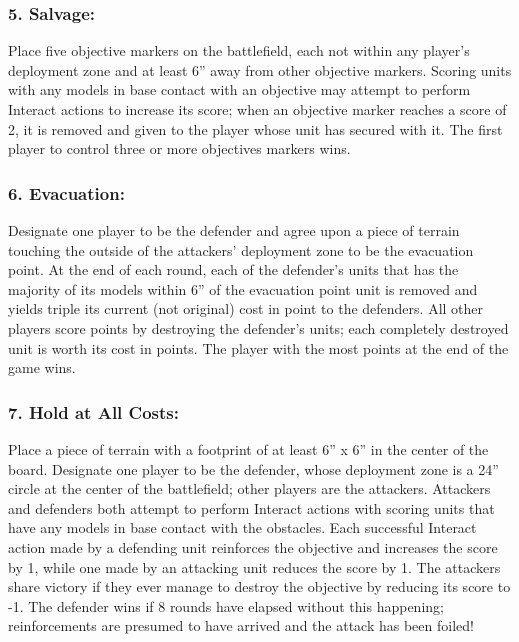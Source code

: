 \begin{multicols}{2}
\subsubsection*{5. Salvage:} Place five objective markers on the battlefield, each not within any player's deployment zone and at least 6'' away from other objective markers. Scoring units with any models in base contact with an objective may attempt to perform Interact actions to increase its score; when an objective marker reaches a score of 2, it is removed and given to the player whose unit has secured with it. The first player to control three or more objectives markers wins.

\subsubsection*{6. Evacuation:} Designate one player to be the defender and agree upon a piece of terrain touching the outside of the attackers' deployment zone to be the evacuation point. At the end of each round, each of the defender's units that has the majority of its models within 6'' of the evacuation point unit is removed and yields triple its current (not original) cost in point to the defenders. All other players score points by destroying the defender's units; each completely destroyed unit is worth its cost in points. The player with the most points at the end of the game wins.

\subsubsection*{7. Hold at All Costs:} Place a piece of terrain with a footprint of at least 6'' x 6'' in the center of the board. Designate one player to be the defender, whose deployment zone is a 24'' circle at the center of the battlefield; other players are the attackers. Attackers and defenders both attempt to perform Interact actions with scoring units that have any models in base contact with the obstacles. Each successful Interact action made by a defending unit reinforces the objective and increases the score by 1, while one made by an attacking unit reduces the score by 1. The attackers share victory if they ever manage to destroy the objective by reducing its score to -1. The defender wins if 8 rounds have elapsed without this happening; reinforcements are presumed to have arrived and the attack has been foiled!


\end{multicols}
